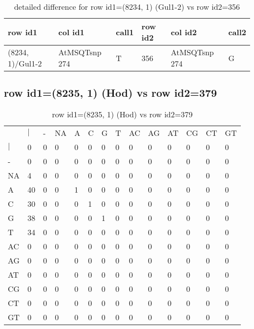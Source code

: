 \begin{center}
\begin{longtable}{|l|l|l|l|l|l|}
\caption{detailed difference for row id1=(8234, 1) (Gul1-2) vs row id2=356} \label{table_dm159}\\
\hline
row id1&col id1&call1&row id2&col id2&call2\\
\hline
(8234, 1)/Gul1-2&AtMSQTsnp 274&T&356&AtMSQTsnp 274&G\\
\hline
\end{longtable}
\end{center}

\subsection{row id1=(8235, 1) (Hod) vs row id2=379}
\begin{center}
\begin{longtable}{|l|l|l|l|l|l|l|l|l|l|l|l|l|l|}
\caption{row id1=(8235, 1) (Hod) vs row id2=379} \label{table_dm160}\\
\hline
\\
\hline
&$|$&-&NA&A&C&G&T&AC&AG&AT&CG&CT&GT\\
$|$&0&0&0&0&0&0&0&0&0&0&0&0&0\\
-&0&0&0&0&0&0&0&0&0&0&0&0&0\\
NA&4&0&0&0&0&0&0&0&0&0&0&0&0\\
A&40&0&0&1&0&0&0&0&0&0&0&0&0\\
C&30&0&0&0&1&0&0&0&0&0&0&0&0\\
G&38&0&0&0&0&1&0&0&0&0&0&0&0\\
T&34&0&0&0&0&0&0&0&0&0&0&0&0\\
AC&0&0&0&0&0&0&0&0&0&0&0&0&0\\
AG&0&0&0&0&0&0&0&0&0&0&0&0&0\\
AT&0&0&0&0&0&0&0&0&0&0&0&0&0\\
CG&0&0&0&0&0&0&0&0&0&0&0&0&0\\
CT&0&0&0&0&0&0&0&0&0&0&0&0&0\\
GT&0&0&0&0&0&0&0&0&0&0&0&0&0\\
\hline
\end{longtable}
\end{center}

